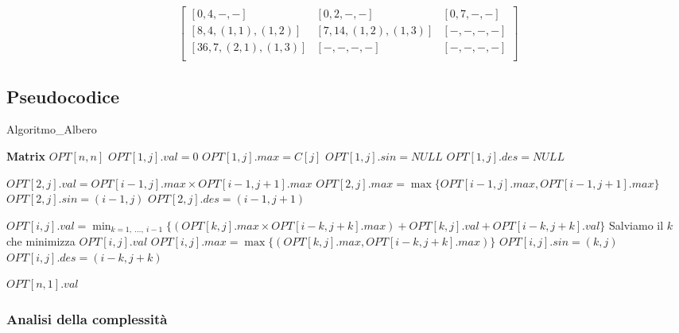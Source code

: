 \[
	\begin{bmatrix}
		[0, 4, -, -]            & [0, 2, -, -]            & [0, 7, -, -] \\
		[8, 4, (1, 1), (1, 2)]  & [7, 14, (1, 2), (1, 3)] & [-, -, -, -] \\
		[36, 7, (2, 1), (1, 3)] & [-, -, -, -]            & [-, -, -, -] \\
	\end{bmatrix}
\]


\subsection{Pseudocodice}


\begin{algorithm}
	\caption{Algoritmo\_Albero}
	\begin{algorithmic}[1]
		\State \textbf{Matrix} $OPT[n, n]$ 
		\State {}
		\State $OPT[1, j].val = 0$
		\State $OPT[1, j].max = C[j]$
		\State $OPT[1, j].sin = NULL$
		\State $OPT[1, j].des = NULL$
		\EndFor

		\State {}

		\State $OPT[2, j].val = OPT[i - 1, j].max \times OPT[i - 1, j + 1].max$
		\State $OPT[2, j].max = \max\{OPT[i - 1, j].max, OPT[i - 1, j + 1].max\}$
		\State $OPT[2, j].sin = (i - 1, j)$
		\State $OPT[2, j].des = (i - 1, j + 1)$
		\EndFor
		\EndIf
		\State {}

		\State {}
		\State $OPT[i, j].val = \min_{k = 1,\ \dots,\ i - 1}\{(OPT[k, j].max \times OPT[i - k, j + k].max) + OPT[k, j].val + OPT[i - k, j + k].val\}$
		\State Salviamo il $k$ che minimizza $OPT[i, j].val$
		\State $OPT[i, j].max = \max\{(OPT[k, j].max, OPT[i - k, j + k].max)\}$
		\State $OPT[i, j].sin = (k, j)$
		\State $OPT[i, j].des = (i - k, j + k)$
		\EndFor
		\EndFor
		\EndIf
		
		\Return $OPT[n, 1].val$
		\EndFunction
	\end{algorithmic}
\end{algorithm}

\subsubsection*{Analisi della complessità}

